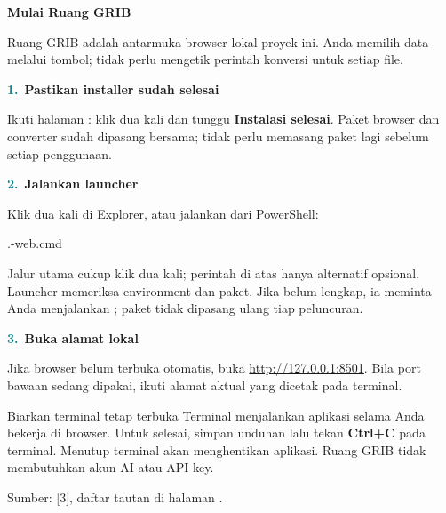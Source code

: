 \documentclass[11pt,a4paper]{article}
\newcommand{\step}[2]{\par\addvspace{2mm}\noindent\textcolor{teal}{\textbf{#1.}}\ \textbf{#2}\par\nobreak}
\newcommand{\pagetitle}[3]{\clearpage{\color{teal}\small\bfseries LANGKAH #1}\par{\color{slate}\LARGE\bfseries #2}\par\vspace{2mm}#3\par\vspace{3mm}}
\newcommand{\source}[1]{{\footnotesize\color{blue}Sumber: [#1], daftar tautan di halaman \pageref{pg:references}.}\par}
\begin{document}
\pagetitle{8}{Mulai Ruang GRIB}{Ruang GRIB adalah antarmuka browser lokal proyek ini. Anda memilih data melalui tombol; tidak perlu mengetik perintah konversi untuk setiap file.}
\label{pg:web-start}
\step{1}{Pastikan installer sudah selesai}
Ikuti halaman \pageref{pg:packages}: klik dua kali  dan tunggu
\textbf{Instalasi selesai}. Paket browser dan converter sudah dipasang bersama;
tidak perlu memasang paket lagi sebelum setiap penggunaan.
\step{2}{Jalankan launcher}
Klik dua kali  di Explorer, atau jalankan dari PowerShell:
\begin{terminal}
.\start-web.cmd
\end{terminal}
Jalur utama cukup klik dua kali; perintah di atas hanya alternatif opsional.
Launcher memeriksa environment dan paket. Jika belum lengkap, ia meminta
Anda menjalankan ; paket tidak dipasang ulang tiap peluncuran.
\step{3}{Buka alamat lokal}
Jika browser belum terbuka otomatis, buka
\href{http://127.0.0.1:8501}{http://127.0.0.1:8501}. Bila port bawaan sedang
dipakai, ikuti alamat aktual yang dicetak pada terminal.
\vspace{2mm}
\par\noindent{}\par
\vspace{3mm}
\begin{panel}{Biarkan terminal tetap terbuka}
Terminal menjalankan aplikasi selama Anda bekerja di browser. Untuk selesai,
simpan unduhan lalu tekan \textbf{Ctrl+C} pada terminal. Menutup terminal akan
menghentikan aplikasi. Ruang GRIB tidak membutuhkan akun AI atau API key.
\end{panel}
\source{3}
\end{document}
